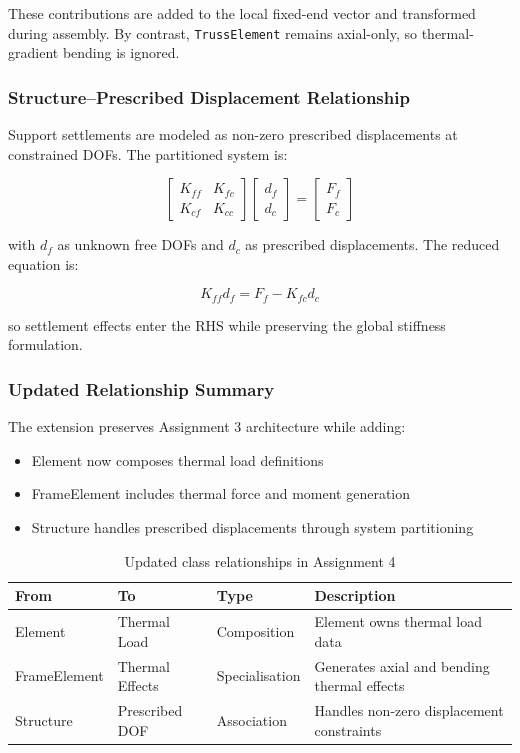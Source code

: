 These contributions are added to the local fixed-end vector and transformed during
assembly. By contrast, \texttt{TrussElement} remains axial-only, so thermal-gradient
bending is ignored.

\subsubsection{Structure--Prescribed Displacement Relationship}

Support settlements are modeled as non-zero prescribed displacements at constrained
DOFs. The partitioned system is:

\[
\begin{bmatrix}
K_{ff} & K_{fc} \\
K_{cf} & K_{cc}
\end{bmatrix}
\begin{bmatrix}
d_f \\
d_c
\end{bmatrix}
=
\begin{bmatrix}
F_f \\
F_c
\end{bmatrix}
\]

with $d_f$ as unknown free DOFs and $d_c$ as prescribed displacements. The reduced
equation is:

\[
K_{ff} d_f = F_f - K_{fc} d_c
\]

so settlement effects enter the RHS while preserving the global stiffness formulation.

\subsubsection{Updated Relationship Summary}

The extension preserves Assignment 3 architecture while adding:

\begin{itemize}
    \item Element now composes thermal load definitions
    \item FrameElement includes thermal force and moment generation
    \item Structure handles prescribed displacements through system partitioning
\end{itemize}

\begin{table}[H]
\centering
\caption{Updated class relationships in Assignment 4}
\begin{tabular}{llll}
\toprule
From & To & Type & Description \\
\midrule
Element & Thermal Load & Composition & Element owns thermal load data \\
FrameElement & Thermal Effects & Specialisation & Generates axial and bending thermal effects \\
Structure & Prescribed DOF & Association & Handles non-zero displacement constraints \\
\bottomrule
\end{tabular}
\end{table}

